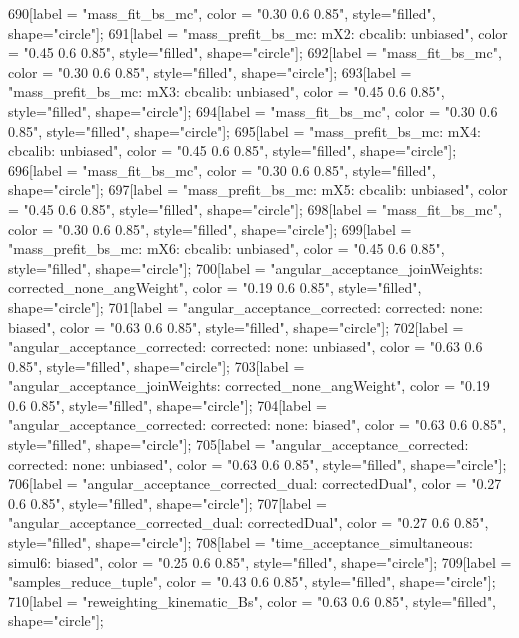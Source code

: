 {	690[label = "mass_fit_bs_mc", color = "0.30 0.6 0.85", style="filled", shape="circle"];
	691[label = "mass_prefit_bs_mc\nmassbin: mX2\nmassmodel: cbcalib\ntrigger: unbiased", color = "0.45 0.6 0.85", style="filled", shape="circle"];
	692[label = "mass_fit_bs_mc", color = "0.30 0.6 0.85", style="filled", shape="circle"];
	693[label = "mass_prefit_bs_mc\nmassbin: mX3\nmassmodel: cbcalib\ntrigger: unbiased", color = "0.45 0.6 0.85", style="filled", shape="circle"];
	694[label = "mass_fit_bs_mc", color = "0.30 0.6 0.85", style="filled", shape="circle"];
	695[label = "mass_prefit_bs_mc\nmassbin: mX4\nmassmodel: cbcalib\ntrigger: unbiased", color = "0.45 0.6 0.85", style="filled", shape="circle"];
	696[label = "mass_fit_bs_mc", color = "0.30 0.6 0.85", style="filled", shape="circle"];
	697[label = "mass_prefit_bs_mc\nmassbin: mX5\nmassmodel: cbcalib\ntrigger: unbiased", color = "0.45 0.6 0.85", style="filled", shape="circle"];
	698[label = "mass_fit_bs_mc", color = "0.30 0.6 0.85", style="filled", shape="circle"];
	699[label = "mass_prefit_bs_mc\nmassbin: mX6\nmassmodel: cbcalib\ntrigger: unbiased", color = "0.45 0.6 0.85", style="filled", shape="circle"];
	700[label = "angular_acceptance_joinWeights\nwflag: corrected_none_angWeight", color = "0.19 0.6 0.85", style="filled", shape="circle"];
	701[label = "angular_acceptance_corrected\nangacc: corrected\ncsp: none\ntrigger: biased", color = "0.63 0.6 0.85", style="filled", shape="circle"];
	702[label = "angular_acceptance_corrected\nangacc: corrected\ncsp: none\ntrigger: unbiased", color = "0.63 0.6 0.85", style="filled", shape="circle"];
	703[label = "angular_acceptance_joinWeights\nwflag: corrected_none_angWeight", color = "0.19 0.6 0.85", style="filled", shape="circle"];
	704[label = "angular_acceptance_corrected\nangacc: corrected\ncsp: none\ntrigger: biased", color = "0.63 0.6 0.85", style="filled", shape="circle"];
	705[label = "angular_acceptance_corrected\nangacc: corrected\ncsp: none\ntrigger: unbiased", color = "0.63 0.6 0.85", style="filled", shape="circle"];
	706[label = "angular_acceptance_corrected_dual\nstep: correctedDual", color = "0.27 0.6 0.85", style="filled", shape="circle"];
	707[label = "angular_acceptance_corrected_dual\nstep: correctedDual", color = "0.27 0.6 0.85", style="filled", shape="circle"];
	708[label = "time_acceptance_simultaneous\ntimeacc: simul6\ntrigger: biased", color = "0.25 0.6 0.85", style="filled", shape="circle"];
	709[label = "samples_reduce_tuple", color = "0.43 0.6 0.85", style="filled", shape="circle"];
	710[label = "reweighting_kinematic_Bs", color = "0.63 0.6 0.85", style="filled", shape="circle"];
}
